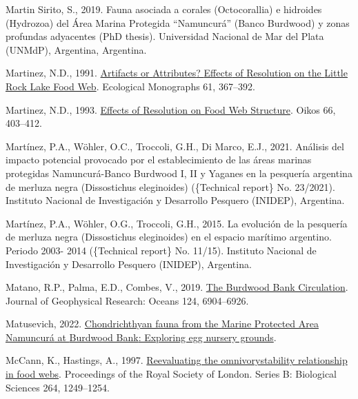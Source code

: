 \documentclass[preprint, 3p,
authoryear]{elsarticle} %
\newlength{\cslhangindent}
\newlength{\cslentryspacingunit} %
\newenvironment{CSLReferences}[2] %
 {%
  \setlength{\parindent}{0pt}
  \ifodd #1
  \let\oldpar\par
  \def\par{\hangindent=\cslhangindent\oldpar}
  \fi
  \setlength{\parskip}{#2\cslentryspacingunit}
 }%
 {}
\begin{document}
\begin{CSLReferences}{1}{0}
\leavevmode{}%
Martin Sirito, S., 2019. {Fauna asociada a corales (Octocorallia) e
hidroides (Hydrozoa) del Área Marina Protegida {``Namuncurá''} (Banco
Burdwood) y zonas profundas adyacentes} (PhD thesis). Universidad
Nacional de Mar del Plata (UNMdP), Argentina, {Argentina}.

\leavevmode{}%
Martinez, N.D., 1991. \href{https://doi.org/10.2307/2937047}{Artifacts
or {Attributes}? {Effects} of {Resolution} on the {Little Rock Lake Food
Web}}. Ecological Monographs 61, 367--392.

\leavevmode{}%
Martinez, N.D., 1993. \href{https://doi.org/10.2307/3544934}{Effects of
{Resolution} on {Food Web Structure}}. Oikos 66, 403--412.

\leavevmode{}%
Martínez, P.A., Wöhler, O.C., Troccoli, G.H., Di Marco, E.J., 2021.
{Análisis del impacto potencial provocado por el establecimiento de las
áreas marinas protegidas Namuncurá-Banco Burdwood I, II y Yaganes en la
pesquería argentina de merluza negra (Dissostichus eleginoides)}
(\{Technical report\} No. 23/2021). {Instituto Nacional de Investigación
y Desarrollo Pesquero (INIDEP), Argentina}.

\leavevmode{}%
Martínez, P.A., Wöhler, O.G., Troccoli, G.H., 2015. {La evolución de la
pesquería de merluza negra (Dissostichus eleginoides) en el espacio
marítimo argentino. Periodo 2003- 2014} (\{Technical report\} No.
11/15). {Instituto Nacional de Investigación y Desarrollo Pesquero
(INIDEP), Argentina}.

\leavevmode{}%
Matano, R.P., Palma, E.D., Combes, V., 2019.
\href{https://doi.org/10.1029/2019JC015001}{The {Burdwood Bank
Circulation}}. Journal of Geophysical Research: Oceans 124, 6904--6926.

\leavevmode{}%
Matusevich, 2022.
\href{https://doi.org/10.21203/rs.3.rs-2247873/v1}{Chondrichthyan fauna
from the {Marine Protected Area Namuncurá} at {Burdwood Bank}: Exploring
egg nursery grounds}.

\leavevmode{}%
McCann, K., Hastings, A., 1997.
\href{https://doi.org/10.1098/rspb.1997.0172}{Re\textendash evaluating
the omnivory\textendash stability relationship in food webs}.
Proceedings of the Royal Society of London. Series B: Biological
Sciences 264, 1249--1254.


\end{CSLReferences}
\end{document}

